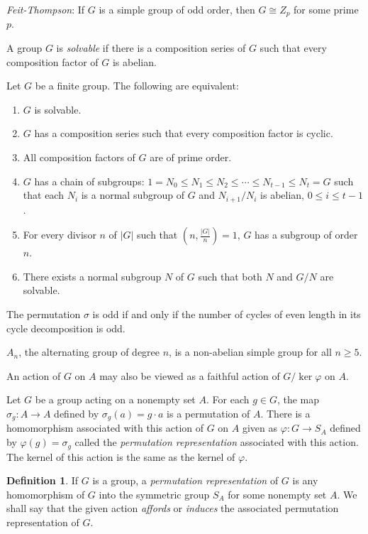 \documentclass{article}
\numberwithin{equation}{section}
\theoremstyle{definition}
\newtheorem{definition}{Definition}
\numberwithin{definition}{section}
\numberwithin{theorem}{section}
\theoremstyle{remark}
\numberwithin{exercise}{section}
\begin{document}
    \textit{Feit-Thompson}: If $G$ is a simple group of odd order, then $G\cong Z_p$ for some prime $p$.
    
    A group $G$ is \textit{solvable} if there is a composition series of $G$ such that every composition factor of $G$ is abelian.
    
    Let $G$ be a finite group. The following are equivalent:
    \begin{enumerate}[i]
        \item $G$ is solvable.
        \item $G$ has a composition series such that every composition factor is cyclic.
        \item All composition factors of $G$ are of prime order.
        \item $G$ has a chain of subgroups: $1=N_{0} \leq N_{1} \leq N_{2} \leq\cdots\leq N_{t-1}\leq N_{t}=G$ such that each $N_i$ is a normal subgroup of $G$ and $N_{i+1}/N_{i}$ is abelian, $0\leq i\leq t-1$.
        \item For every divisor $n$ of $|G|$ such that $\left(n,\frac{|G|}{n}\right)=1$, $G$ has a subgroup of order $n$.
        \item There exists a normal subgroup $N$ of $G$ such that both $N$ and $G/N$ are solvable.
    \end{enumerate}
    
    The permutation $\sigma$ is odd if and only if the number of cycles of even length in its cycle decomposition is odd.
    
    $A_n$, the alternating group of degree $n$, is a non-abelian simple group for all $n\geq5$.
    
    An action of $G$ on $A$ may also be viewed as a faithful action of $G/\ker \varphi$ on $A$.

    Let $G$ be a group acting on a nonempty set $A$. For each $g\in G$, the map $\sigma_{g}:A\to A$ defined by $\sigma_{g}(a)=g\cdot a$ is a permutation of $A$. There is a homomorphism associated with this action of $G$ on $A$ given as $\varphi:G\to S_A$ defined by $\varphi(g)=\sigma_{g}$ called the \textit{permutation representation} associated with this action. The kernel of this action is the same as the kernel of $\varphi$.
    
    \begin{definition}
    If $G$ is a group, a \textit{permutation representation} of $G$ is any homomorphism of $G$ into the symmetric group $S_A$ for some nonempty set $A$. We shall say that the given action \textit{affords} or \textit{induces} the associated permutation representation of $G$.
    \end{definition}
    
\end{document}
